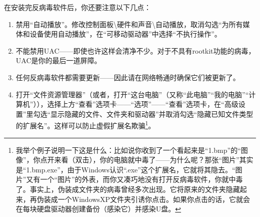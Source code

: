 在安装完反病毒软件后，你还要注意以下几点：
\begin{enumerate}
	\item 禁用“自动播放”。修改控制面板\textbackslash 硬件和声音\textbackslash 自动播放，取消勾选“为所有媒体和设备使用自动播放”，在“可移动驱动器”中选择“不执行操作”。
	\item 不能禁用UAC——即使也许这样会清净不少。对于不具有rootkit功能的病毒，UAC是你的最后一道屏障。
	\item 任何反病毒软件都需要更新——因此请在网络畅通时确保它们被更新了。
	\item 打开“文件资源管理器”（或者，打开“这台电脑”（又称“此电脑”“我的电脑”“计算机”）），选择上方“查看”选项卡——“选项”——“查看”选项卡，在“高级设置”里勾选“显示隐藏的文件、文件夹和驱动器”并取消勾选“隐藏已知文件类型的扩展名”。这样可以防止虚假扩展名欺骗\footnote{我举个例子说明一下这是什么：比如说你收到了一个看起来是“1.bmp”的“图像”，你点开来看（双击），你的电脑就中毒了——为什么呢？那张“图片”其实是“1.bmp.exe”，由于Windows认识“.exe”这个扩展名，它就将其隐去。“图片”又有一个“图片”的外表，而你又凑巧地没有打开反病毒软件，你就中毒了。事实上，伪装成文件夹的病毒曾经多次出现。它将原来的文件夹隐藏起来，再伪装成一个WindowsXP文件夹引诱你点击。如果你点击的话，它就会在每块硬盘驱动器创建备份（感染它）并感染U盘。}。
\end{enumerate}
